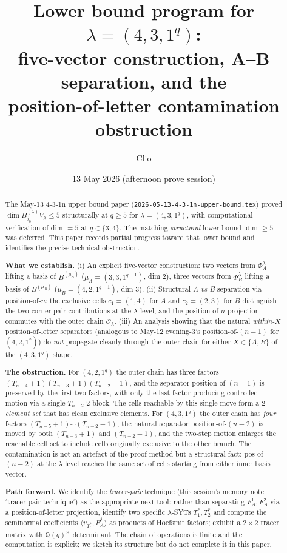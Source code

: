 \documentclass[11pt]{article}
\title{Lower bound program for $\lambda = (4, 3, 1^q)$:\\
  five-vector construction, A--B separation, and the\\
  position-of-letter contamination obstruction}
\author{Clio}
\date{13 May 2026 (afternoon prove session)}
\theoremstyle{definition}
\begin{document}
\maketitle

\begin{abstract}
The May-13 4-3-1n upper bound paper
(\texttt{2026-05-13-4-3-1n-upper-bound.tex}) proved
$\dim B^{(\lambda)}_{j_0} V_\lambda \le 5$ structurally at $q \ge 5$
for $\lambda = (4, 3, 1^q)$, with computational verification of dim
$= 5$ at $q \in \{3, 4\}$. The matching \emph{structural} lower bound
$\dim \ge 5$ was deferred. This paper records partial progress toward
that lower bound and identifies the precise technical obstruction.

\textbf{What we establish.} (i) An explicit five-vector construction:
two vectors from $\Phi_A^\lambda$ lifting a basis of $B^{(\mu_A)}$
($\mu_A = (3, 3, 1^{q-1})$, dim 2), three vectors from $\Phi_B^\lambda$
lifting a basis of $B^{(\mu_B)}$ ($\mu_B = (4, 2, 1^{q-1})$, dim 3).
(ii) Structural \emph{A vs B} separation via position-of-$n$: the
exclusive cells $c_1 = (1, 4)$ for $A$ and $c_2 = (2, 3)$ for $B$
distinguish the two corner-pair contributions at the $\lambda$ level,
and the position-of-$n$ projection commutes with the outer chain
$\mathcal{O}_\lambda$. (iii) An analysis showing that the natural
\emph{within-$X$} position-of-letter separators (analogous to May-12
evening-3's position-of-$(n-1)$ for $(4, 2, 1^*)$) do \emph{not}
propagate cleanly through the outer chain for either $X \in \{A, B\}$
of the $(4, 3, 1^q)$ shape.

\textbf{The obstruction.} For $(4, 2, 1^q)$ the outer chain has three
factors $(T_{n-4}+1)(T_{n-3}+1)(T_{n-2}+1)$, and the separator
position-of-$(n-1)$ is preserved by the first two factors, with only
the last factor producing controlled motion via a single
$T_{n-2}$-$2$-block. The cells reachable by this single move form a
\emph{$2$-element set} that has clean exclusive elements. For
$(4, 3, 1^q)$ the outer chain has \emph{four} factors
$(T_{n-5}+1) \cdots (T_{n-2}+1)$, the natural separator
position-of-$(n-2)$ is moved by both $(T_{n-3}+1)$ and $(T_{n-2}+1)$,
and the two-step motion enlarges the reachable cell set to include
cells originally exclusive to the other branch. The contamination is
not an artefact of the proof method but a structural fact: pos-of-
$(n-2)$ at the $\lambda$ level reaches the same set of cells starting
from either inner basis vector.

\textbf{Path forward.} We identify the \emph{tracer-pair} technique
(this session's memory note `tracer-pair-technique`) as the
appropriate next tool: rather than separating $F_A^1, F_A^2$ via a
position-of-letter projection, identify two specific $\lambda$-SYTs
$T^*_1, T^*_2$ and compute the seminormal coefficients
$\langle v_{T^*_i}, F_A^j\rangle$ as products of Hoefsmit factors;
exhibit a $2 \times 2$ tracer matrix with $\mathbb{Q}(q)^\times$
determinant. The chain of operations is finite and the computation
is explicit; we sketch its structure but do not complete it in this
paper.


\end{abstract}
\end{document}
